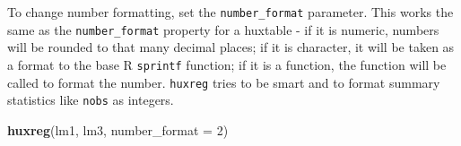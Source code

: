 \documentclass[]{article}
\newenvironment{Shaded}{\begin{snugshade}}{\end{snugshade}}
\newcommand{\KeywordTok}[1]{\textcolor[rgb]{0.13,0.29,0.53}{\textbf{#1}}}
\newcommand{\DataTypeTok}[1]{\textcolor[rgb]{0.13,0.29,0.53}{#1}}
\newcommand{\DecValTok}[1]{\textcolor[rgb]{0.00,0.00,0.81}{#1}}
\newcommand{\NormalTok}[1]{#1}
\begin{document}
To change number formatting, set the \texttt{number\_format} parameter.
This works the same as the \texttt{number\_format} property for a
huxtable - if it is numeric, numbers will be rounded to that many
decimal places; if it is character, it will be taken as a format to the
base R \texttt{sprintf} function; if it is a function, the function will
be called to format the number. \texttt{huxreg} tries to be smart and to
format summary statistics like \texttt{nobs} as integers.

\begin{Shaded}
\begin{Highlighting}[]
\KeywordTok{huxreg}\NormalTok{(lm1, lm3, }\DataTypeTok{number_format =} \DecValTok{2}\NormalTok{)}
\end{Highlighting}
\end{Shaded}
\end{document}
